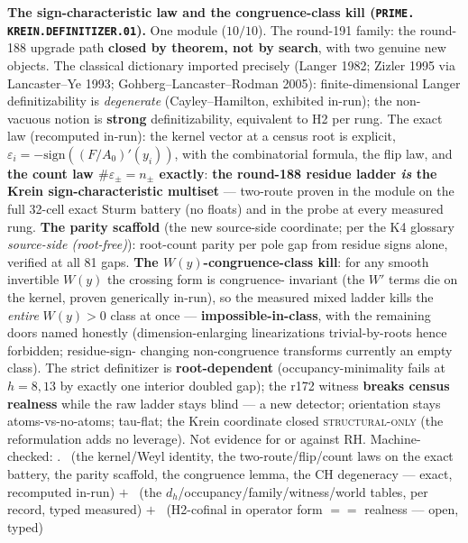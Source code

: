 \par\smallskip\noindent\textbf{The sign-characteristic law and
the congruence-class kill (\texttt{PRIME.\allowbreak
KREIN.\allowbreak DEFINITIZER.01}).}
One module ($10/10$).  The round-191 family: the round-188
upgrade path \textbf{closed by theorem, not by search}, with two
genuine new objects.  The classical dictionary imported precisely
(Langer 1982; Zizler 1995 via Lancaster--Ye 1993;
Gohberg--Lancaster--Rodman 2005): finite-dimensional Langer
definitizability is \emph{degenerate} (Cayley--Hamilton,
exhibited in-run); the non-vacuous notion is \textbf{strong}
definitizability, equivalent to H2 per rung.  The exact law
(recomputed in-run): the kernel vector at a census root is
explicit, $\varepsilon_i = -\mathrm{sign}((F/A_0)'(y_i))$, with
the combinatorial formula, the flip law, and \textbf{the count
law $\#\varepsilon_{\pm} = n_{\pm}$ exactly}: \textbf{the
round-188 residue ladder \emph{is} the Krein sign-characteristic
multiset} --- two-route proven in the module on the full 32-cell
exact Sturm battery (no floats) and in the probe at every
measured rung.  \textbf{The parity scaffold} (the new source-side
coordinate; per the K4 glossary \emph{source-side (root-free)}):
root-count parity per pole gap from residue signs alone, verified
at all 81 gaps.  \textbf{The $W(y)$-congruence-class kill}: for
any smooth invertible $W(y)$ the crossing form is congruence-
invariant (the $W'$ terms die on the kernel, proven generically
in-run), so the measured mixed ladder kills the \emph{entire}
$W(y) > 0$ class at once --- \textbf{impossible-in-class}, with
the remaining doors named honestly (dimension-enlarging
linearizations trivial-by-roots hence forbidden; residue-sign-
changing non-congruence transforms currently an empty class).
The strict definitizer is \textbf{root-dependent}
(occupancy-minimality fails at $h = 8, 13$ by exactly one
interior doubled gap); the r172 witness \textbf{breaks census
realness} while the raw ladder stays blind --- a new detector;
orientation stays atoms-vs-no-atoms; tau-flat; the Krein
coordinate closed \textsc{structural-only} (the reformulation
adds no leverage).  Not evidence for or against RH.
Machine-checked: .
\mE\ (the kernel/Weyl identity, the two-route/flip/count laws on
the exact battery, the parity scaffold, the congruence lemma, the
CH degeneracy --- exact, recomputed in-run) $+$ \mC\ (the
$d_h$/occupancy/family/witness/world tables, per record, typed
measured) $+$ \mO\ (H2-cofinal in operator form $==$ realness ---
open, typed)
\par\smallskip


